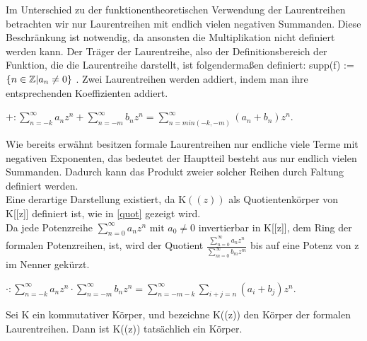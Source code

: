 Im Unterschied zu der funktionentheoretischen Verwendung der Laurentreihen betrachten wir nur Laurentreihen mit endlich vielen negativen Summanden. Diese Beschränkung ist notwendig, da ansonsten die Multiplikation nicht definiert werden kann. Der Träger der Laurentreihe, also der Definitionsbereich der Funktion, die die Laurentreihe darstellt, ist folgendermaßen definiert: supp(f) := $\lbrace n \in \mathbb{Z} | a_n \neq 0 \rbrace$ \label{traeger}. 
Zwei Laurentreihen werden addiert, indem man ihre entsprechenden Koeffizienten addiert. 
%
\begin{center}
$ + : \sum_{n=-k}^\infty a_n z^n  +  \sum_{n=-m}^\infty b_n z^n = \sum_{n = min(-k, -m)}^{\infty}(a_n + b_n) z^n $. 
%
%
\end{center} 
Wie bereits erwähnt besitzen formale Laurentreihen nur endliche viele Terme mit negativen Exponenten, das bedeutet der Hauptteil besteht aus nur endlich vielen Summanden. Dadurch kann das Produkt zweier solcher Reihen durch Faltung definiert werden. \\
Eine derartige Darstellung existiert, da $\text{K}((z)) $ als Quotientenkörper von K[[z]] definiert ist, wie in \ref{quot} gezeigt wird. \\
Da jede Potenzreihe $\sum_{n=0}^{\infty} a_nz^n \text{ mit } a_0\neq0$ invertierbar in K[[z]], dem Ring der formalen Potenzreihen, ist, wird der Quotient $\frac{\sum_{n=0}^{\infty}  a_nz^n}{\sum_{m=0}^\infty b_mz^m}$ bis auf eine Potenz von z im Nenner gekürzt. 
%
\begin{center}
$\cdot : \sum_{n=-k}^{\infty} a_n z^n  \cdot  \sum_{n=-m}^{\infty} b_n z^n = \sum_{n = -m-k}^{\infty}\sum_{i+j=n}^{}\left(a_i + b_j\right) z^n $.  \cite{Lueneburg08}
%
%
\end{center}  
%
%
%
\begin{satz}\label{Laurentreihenkoerper}
Sei K ein kommutativer Körper, und bezeichne K((z)) den Körper der formalen Laurentreihen. Dann ist K((z)) tatsächlich ein Körper. \cite{Lueneburg08}
\end{satz}
